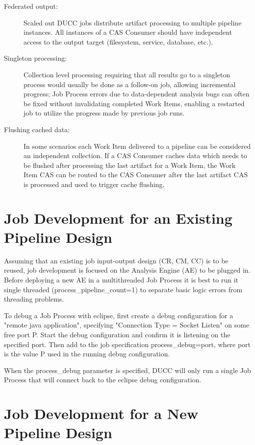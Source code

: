 	\begin{description}
	    \item[Federated output:] Scaled out DUCC jobs distribute artifact processing
	    to multiple pipeline instances. All instances of a CAS Consumer should have
	    independent access to the output target (filesystem, service, database, etc.).
	    \item[Singleton processing:] Collection level processing
	    requiring that all results go to a singleton process would usually be done as a 
            follow-on job, allowing
	    incremental progress; Job Process errors due to data-dependent analysis bugs
	    can often be fixed without invalidating completed Work Items, 
            enabling a restarted job to utilize the progress made by
	    previous job runs.
	    \item[Flushing cached data:] In some scenarios each Work Item delivered to a
	    pipeline can be considered an independent collection. If a CAS Consumer
	    caches data which needs to be flushed after processing the
	    last artifact for a Work Item, the Work Item CAS can be routed to the CAS Consumer after
	    the last artifact CAS is processed and used to trigger cache flushing.
	\end{description}


\section{Job Development for an Existing Pipeline Design}

Assuming that an existing job input-output design (CR, CM, CC) is to be reused, job
development is focused on the Analysis Engine (AE) to be plugged in. Before deploying a new
AE in a multithreaded Job Process it is best to run it single threaded
(process\_pipeline\_count=1) to separate basic logic errors from threading
problems.

To debug a Job Process with eclipse, first create a debug configuration for a
"remote java application", specifying "Connection Type = Socket Listen" on some
free port P. Start the debug configuration and confirm it is listening on the specified port.
Then add to the job specification
process\_debug=port, where port is the value P used in the running debug configuration.

When the process\_debug parameter is specified, DUCC will only run a single Job Process
that will connect back to the eclipse debug configuration.


\section{Job Development for a New Pipeline Design}

